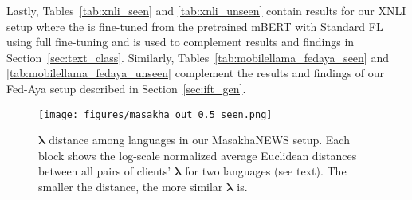 Lastly, Tables~\ref{tab:xnli_seen} and \ref{tab:xnli_unseen} contain results for our XNLI setup where the \basemodel{} is fine-tuned from the pretrained mBERT with Standard FL using full fine-tuning and is used to complement results and findings in Section~\ref{sec:text_class}. Similarly, Tables~\ref{tab:mobilellama_fedaya_seen} and \ref{tab:mobilellama_fedaya_unseen} complement the results and findings of our Fed-Aya setup described in Section~\ref{sec:ift_gen}.


\begin{figure}[t]
    \small
    \centering
    \texttt{[image: figures/masakha\_out\_0.5\_seen.png]}
    \vspace{-3em}
    \caption{$\bm{\lambda}$ distance among languages in our MasakhaNEWS setup. Each block shows the log-scale normalized average Euclidean distances between all pairs of clients' $\bm{\lambda}$ for two languages (see text). The smaller the distance, the more similar $\bm{\lambda}$ is. }
    \label{fig:masakha_out}
\end{figure}








